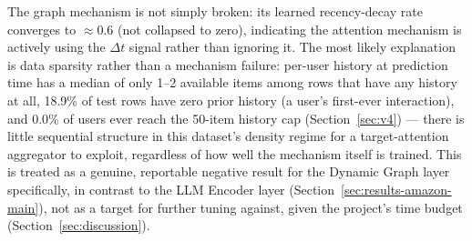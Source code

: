 The graph mechanism is not simply broken: its learned recency-decay rate converges to $\approx 0.6$ (not collapsed to zero), indicating the attention mechanism is actively using the $\Delta t$ signal rather than ignoring it. The most likely explanation is data sparsity rather than a mechanism failure: per-user history at prediction time has a median of only 1--2 available items among rows that have any history at all, 18.9\% of test rows have zero prior history (a user's first-ever interaction), and 0.0\% of users ever reach the 50-item history cap (Section~\ref{sec:v4}) --- there is little sequential structure in this dataset's density regime for a target-attention aggregator to exploit, regardless of how well the mechanism itself is trained. This is treated as a genuine, reportable negative result for the Dynamic Graph layer specifically, in contrast to the LLM Encoder layer (Section~\ref{sec:results-amazon-main}), not as a target for further tuning against, given the project's time budget (Section~\ref{sec:discussion}).
